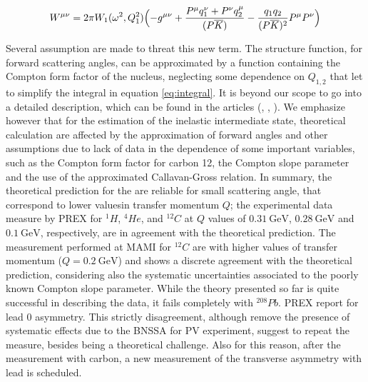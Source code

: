 \begin{equation}
W^{\mu \nu} = 2 \pi W_{1}(\omega^{2},Q_{1}^{2}) \Bigl( -g^{\mu \nu} + \dfrac{P^{\mu}q_{1}^{\nu} +  P^{\nu}q_{2}^{\mu}}{(P \overline{K})} - \dfrac{q_{1} q_{2}}{(P \overline{K})^{2}}P^{\mu}P^{\nu} \Bigl)
\end{equation}

Several assumption are made to threat this new term. The structure function, for forward scattering angles, can be approximated by a function containing the Compton form factor of the nucleus, neglecting some dependence on $Q_{1,2}$ that let to simplify the integral in equation \ref{eq:integral}. It is beyond our scope to go into a detailed description, which can be found in the articles (\cite{Gorchtein_2006}, \cite{Gorchtein_2008}, \cite{Koshchii_2021}). We emphasize however that for the estimation of the inelastic intermediate state, theoretical calculation are affected by the approximation of forward angles and other assumptions due to lack of data in the dependence of some important variables, such as the Compton form factor for carbon 12, the Compton slope parameter and the use of the approximated Callavan-Gross relation. In summary, the theoretical prediction for the \transv are reliable for small scattering angle, that correspond to lower values ​​in transfer momentum $Q$; the experimental data measure by PREX \cite{HAPPEX:2012fud} for $^{1}H$, $^{4}He$, and $^{12}C$ at $Q$ values of $\SI{0.31}{\giga \electronvolt}$, $\SI{0.28}{\giga \electronvolt}$ and $\SI{0.1}{\giga \electronvolt}$, respectively, are in agreement with the theoretical prediction. The measurement performed at MAMI for $^{12}C$ \cite{Esser:2018vdp} are with higher values of transfer momentum ($Q = \SI{0.2}{\giga \electronvolt}$) and shows a discrete agreement with the theoretical prediction, considering also the systematic uncertainties associated to the poorly known Compton slope parameter.
While the theory presented so far is quite successful in describing the data, it fails completely with $^{208}Pb$. PREX report for lead $0$ asymmetry. This strictly disagreement, although remove the presence of systematic effects due to the BNSSA for PV experiment, suggest to repeat the measure, besides being a theoretical challenge. Also for this reason, after the measurement with carbon, a new measurement of the transverse asymmetry with lead is scheduled.

